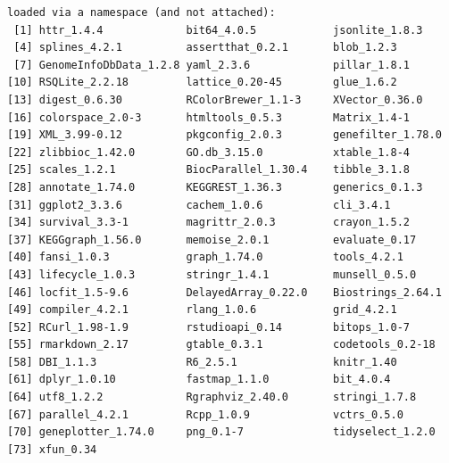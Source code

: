 \documentclass[
  letterpaper,
  DIV=11,
  numbers=noendperiod]{scrartcl}
\begin{document}
\begin{verbatim}
loaded via a namespace (and not attached):
 [1] httr_1.4.4             bit64_4.0.5            jsonlite_1.8.3        
 [4] splines_4.2.1          assertthat_0.2.1       blob_1.2.3            
 [7] GenomeInfoDbData_1.2.8 yaml_2.3.6             pillar_1.8.1          
[10] RSQLite_2.2.18         lattice_0.20-45        glue_1.6.2            
[13] digest_0.6.30          RColorBrewer_1.1-3     XVector_0.36.0        
[16] colorspace_2.0-3       htmltools_0.5.3        Matrix_1.4-1          
[19] XML_3.99-0.12          pkgconfig_2.0.3        genefilter_1.78.0     
[22] zlibbioc_1.42.0        GO.db_3.15.0           xtable_1.8-4          
[25] scales_1.2.1           BiocParallel_1.30.4    tibble_3.1.8          
[28] annotate_1.74.0        KEGGREST_1.36.3        generics_0.1.3        
[31] ggplot2_3.3.6          cachem_1.0.6           cli_3.4.1             
[34] survival_3.3-1         magrittr_2.0.3         crayon_1.5.2          
[37] KEGGgraph_1.56.0       memoise_2.0.1          evaluate_0.17         
[40] fansi_1.0.3            graph_1.74.0           tools_4.2.1           
[43] lifecycle_1.0.3        stringr_1.4.1          munsell_0.5.0         
[46] locfit_1.5-9.6         DelayedArray_0.22.0    Biostrings_2.64.1     
[49] compiler_4.2.1         rlang_1.0.6            grid_4.2.1            
[52] RCurl_1.98-1.9         rstudioapi_0.14        bitops_1.0-7          
[55] rmarkdown_2.17         gtable_0.3.1           codetools_0.2-18      
[58] DBI_1.1.3              R6_2.5.1               knitr_1.40            
[61] dplyr_1.0.10           fastmap_1.1.0          bit_4.0.4             
[64] utf8_1.2.2             Rgraphviz_2.40.0       stringi_1.7.8         
[67] parallel_4.2.1         Rcpp_1.0.9             vctrs_0.5.0           
[70] geneplotter_1.74.0     png_0.1-7              tidyselect_1.2.0      
[73] xfun_0.34             
\end{verbatim}
\end{document}
